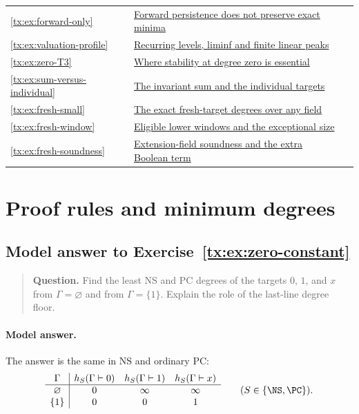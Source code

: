 \begin{longtable}{@{}lp{}r@{}}
\ref{tx:ex:forward-only} & \hyperref[tx:ans:forward-only]{Forward persistence does not preserve exact minima} & \pageref{tx:ans:forward-only}\\

\ref{tx:ex:valuation-profile} & \hyperref[tx:ans:valuation-profile]{Recurring levels, liminf and finite linear peaks} & \pageref{tx:ans:valuation-profile}\\

\ref{tx:ex:zero-T3} & \hyperref[tx:ans:zero-T3]{Where stability at degree zero is essential} & \pageref{tx:ans:zero-T3}\\

\ref{tx:ex:sum-versus-individual} & \hyperref[tx:ans:sum-versus-individual]{The invariant sum and the individual targets} & \pageref{tx:ans:sum-versus-individual}\\

\ref{tx:ex:fresh-small} & \hyperref[tx:ans:fresh-small]{The exact fresh-target degrees over any field} & \pageref{tx:ans:fresh-small}\\

\ref{tx:ex:fresh-window} & \hyperref[tx:ans:fresh-window]{Eligible lower windows and the exceptional size} & \pageref{tx:ans:fresh-window}\\

\ref{tx:ex:fresh-soundness} & \hyperref[tx:ans:fresh-soundness]{Extension-field soundness and the extra Boolean term} & \pageref{tx:ans:fresh-soundness}\\

\bottomrule
\end{longtable}
\clearpage

\section{Proof rules and minimum degrees}

\begin{samepage}

\subsection*{Model answer to Exercise~\ref{tx:ex:zero-constant}}\label{tx:ans:zero-constant}

\begin{quote}\small\textbf{Question.} Find the least NS and PC degrees of the targets $0$, $1$, and $x$ from
$\Gamma=\varnothing$ and from $\Gamma=\{1\}$. Explain the role of the
last-line degree floor.
\end{quote}

\paragraph{Model answer.}
The answer is the same in NS and ordinary PC:
\[
 \begin{array}{c|ccc}
 \Gamma & h_S(\Gamma\vdash0)&h_S(\Gamma\vdash1)&h_S(\Gamma\vdash x)\\
 \hline
 \varnothing&0&\infty&\infty\\
 \{1\}&0&0&1
 \end{array}
 \qquad(S\in\{\NS,\PC\}).
\]
\end{samepage}

